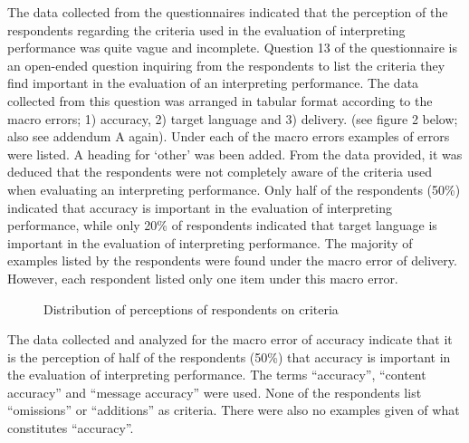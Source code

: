\documentclass[output=paper]{langsci/langscibook}
\begin{document}
The data collected from the questionnaires indicated that the perception of the respondents regarding the criteria used in the evaluation of interpreting performance was quite vague and incomplete. Question 13 of the questionnaire is an open-ended question inquiring from the respondents to list the criteria they find important in the evaluation of an interpreting performance.  The data collected from this question was arranged in tabular format according to the macro errors; 1) accuracy, 2) target language and 3) delivery. (see figure 2 below; also see addendum A again). Under each of the macro errors examples of errors were listed. A heading for ‘other’ was been added. From the data provided, it was deduced that the respondents were not completely aware of the criteria used when evaluating an interpreting performance.  Only half of the respondents (50\%) indicated that accuracy is important in the evaluation of interpreting performance, while only 20\% of respondents indicated that target language is important in the evaluation of interpreting performance. The majority of examples listed by the respondents were found under the macro error of delivery. However, each respondent listed only one item under this macro error. 

\begin{figure}
\caption{\label{fig:deysel:2}Distribution of perceptions of respondents on criteria}
\end{figure}

The data collected and analyzed for the macro error of accuracy indicate that it is the perception of half of the respondents (50\%) that accuracy is important in the evaluation of interpreting performance. The terms “accuracy”, “content accuracy” and “message accuracy” were used. None of the respondents list “omissions” or “additions” as criteria. There were also no examples given of what constitutes “accuracy”.  
\end{document}
